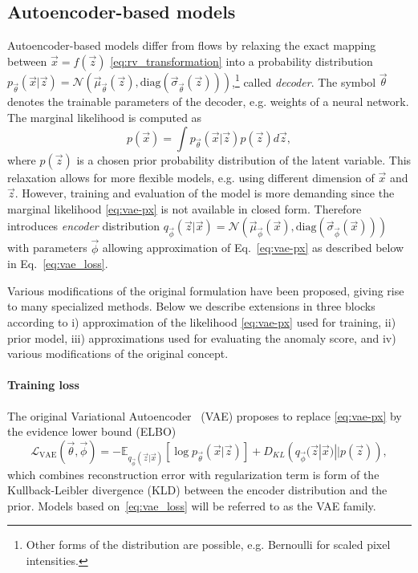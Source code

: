 \subsection{Autoencoder-based models}
\label{sec:ae_theory}
Autoencoder-based models differ from flows by relaxing the exact mapping between $\vec{x}=f(\vec{z})$ \eqref{eq:rv_transformation} into a probability distribution $p_{\vec{\theta}} (\vec{x}|\vec{z})=\mathcal{N}(\vec{\mu}_{\vec{\theta}}(\vec{z}), \mathrm{diag}(\vec{\sigma}_{\vec{\theta}}(\vec{z})))$,\footnote{Other forms of the distribution are possible, e.g. Bernoulli for scaled pixel intensities.} called \emph{decoder}. The symbol $\vec{\theta}$ denotes the trainable parameters of the decoder, e.g. weights of a neural network. The marginal likelihood is computed as
\begin{equation}
    p(\vec{x})=\int p_{\vec{\theta}}(\vec{x}|\vec{z})p(\vec{z}) d\vec{z},
    \label{eq:vae-px}
\end{equation}
where $p(\vec{z})$  is a chosen prior probability distribution of the latent variable. This relaxation allows for more flexible models, e.g. using different dimension of $\vec{x}$ and $\vec{z}$. However, training and evaluation of the model is more demanding since the marginal likelihood \eqref{eq:vae-px} is not available in closed form. Therefore~\cite{kingma2013auto} introduces \emph{encoder} distribution $q_{\vec{\phi}}(\vec{z}|\vec{x})=\mathcal{N}(\vec{\mu}_{\vec{\phi}}(\vec{x}), \mathrm{diag}(\vec{\sigma}_{\vec{\phi}}(\vec{x})))$  with parameters $\vec{\phi}$ allowing approximation of Eq.~\eqref{eq:vae-px} as described below in Eq.~\ref{eq:vae_loss}.

Various modifications of the original formulation have been proposed, giving rise to many specialized methods. Below we describe extensions in three blocks according to i) approximation of the likelihood \eqref{eq:vae-px} used for training, ii) prior model, iii) approximations used for evaluating the anomaly score, and iv) various modifications of the original concept.

\paragraph{Training loss}
The original Variational Autoencoder~\cite{kingma2013auto} (VAE) proposes to replace \eqref{eq:vae-px} by the evidence lower bound (ELBO)
\begin{equation}
    \mathcal{L}_{\text{VAE}} (\vec{\theta}, \vec{\phi}) = - \mathbb{E}_{q_{\vec{\phi}}(\vec{z}|\vec{x})} \left[ \log p_{\vec{\theta}}(\vec{x}|\vec{z}) \right] + D_{KL} \left( q_{\vec{\phi}}(\vec{z}|\vec{x}) || p(\vec{z}) \right),
\label{eq:vae_loss}
\end{equation}
which combines reconstruction error with regularization term is form of the Kullback-Leibler divergence (KLD) between the encoder distribution and the prior. Models based on~\eqref{eq:vae_loss} will be referred to as the VAE family.


